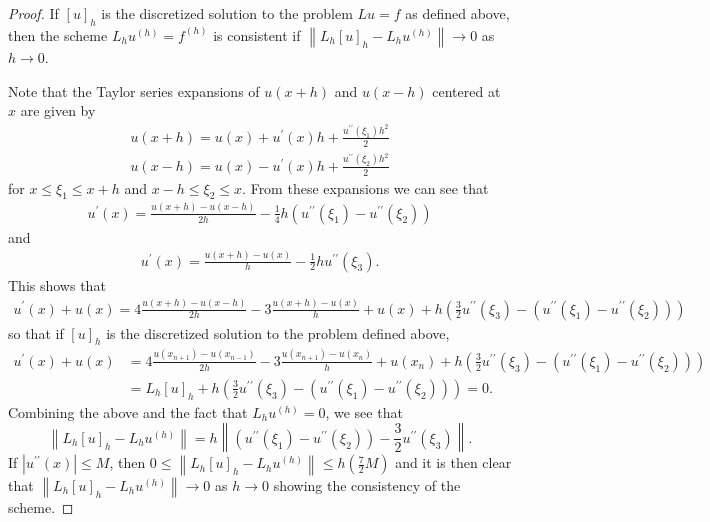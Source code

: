 \documentclass[12pt]{article}
\theoremstyle{definition}
\newcommand\norm[1]{\left\lVert#1\right\rVert}
\begin{document}
\begin{proof}
  If $[u]_h$ is the discretized solution to the problem $Lu = f$ as defined above,
  then the scheme $L_h u^{(h)} = f^{(h)}$ is consistent if $\norm{L_h[u]_h - L_hu^{(h)}} \to 0$
  as $h \to 0$.

  Note that the Taylor series expansions of $u(x + h)$ and $u(x - h)$ centered at $x$ are given by
  \begin{align*}
    u(x + h) = u(x) + u^{\prime}(x) h + \frac{u^{\prime \prime}(\xi_1) h^2}{2} \\
    u(x - h) = u(x) - u^{\prime}(x) h + \frac{u^{\prime \prime}(\xi_2) h^2}{2}
  \end{align*}
  for $x \leq \xi_1 \leq x+h$ and $x-h \leq \xi_2 \leq x$.
  From these expansions we can see that
  \begin{align*}
    u^{\prime}(x) = \frac{u(x+h) - u(x-h)}{2h}  - \frac{1}{4}h(u^{\prime \prime}(\xi_1) - u^{\prime \prime}(\xi_2))
  \end{align*}
  and
  \begin{align*}
    u^{\prime}(x) = \frac{u(x+h) - u(x)}{h} - \frac{1}{2}hu^{\prime \prime}(\xi_3).
  \end{align*}
  This shows that
  \begin{align*}
    u^{\prime}(x) + u(x) = 4\frac{u(x+h) - u(x-h)}{2h} - 3\frac{u(x+h) - u(x)}{h} + u(x) + h\left(\frac{3}{2}u^{\prime \prime}(\xi_3) - (u^{\prime \prime}(\xi_1) - u^{\prime \prime}(\xi_2))\right)
  \end{align*}
  so that if $[u]_h$ is the discretized solution to the problem defined above,
  \begin{align*}
    u^{\prime}(x) + u(x) &= 4\frac{u(x_{n+1}) - u(x_{n-1})}{2h} - 3\frac{u(x_{n+1}) - u(x_n)}{h} + u(x_n) + h\left(\frac{3}{2}u^{\prime \prime}(\xi_3) - (u^{\prime \prime}(\xi_1) - u^{\prime \prime}(\xi_2))\right)\\
    &= L_h[u]_h + h\left(\frac{3}{2}u^{\prime \prime}(\xi_3) - (u^{\prime \prime}(\xi_1) - u^{\prime \prime}(\xi_2))\right) = 0.
  \end{align*}
  Combining the above and the fact that $L_h u^{(h)} = 0$, we see that
  \[
    \norm{L_h [u]_h - L_h u^{(h)}} = h\norm{(u^{\prime \prime}(\xi_1) - u^{\prime \prime}(\xi_2)) - \frac{3}{2}u^{\prime \prime}(\xi_3)}.
  \]
  If $|u^{\prime \prime}(x)| \leq M$, then $0 \leq \norm{L_h [u]_h - L_h u^{(h)}} \leq h \left(\frac{7}{2}M\right)$
  and it is then clear that $\norm{L_h [u]_h - L_h u^{(h)}} \to 0$ as $h \to 0$ showing the
  consistency of the scheme.
\end{proof}
\end{document}
